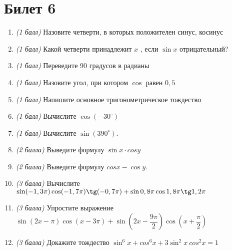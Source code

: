 \documentclass[12pt, a4paper]{article}
\begin{document}
\section*{Билет 6}
\begin{enumerate}
	\item \textit{(1 балл)}	Назовите четверти, в которых положителен синус, косинус 
	\item \textit{(1 балл)}	Какой четверти принадлежит $x$ , если $\sin x$ отрицательный?
	\item \textit{(1 балл)}	Переведите 90 градусов в радианы
	\item \textit{(1 балл)}	Назовите угол, при котором $\cos$  равен $0,5$
	\item \textit{(1 балл)} Напишите основное тригонометрическое тождество
	\item \textit{(1 балл)} Вычислите $\cos (-30^{\circ})$
	\item \textit{(1 балл)}	Вычислите $\sin (390^{\circ})$.
	\item \textit{(2 балла)} Выведите формулу $\sin x \cdot cos y$ 
	\item \textit{(2 балла)} Выведите формулу $cos x - \cos y$.
	\item \textit{(3 балла)} Вычислите $\sin(-1,3\pi) \cos (-1,7 \pi) \tg (-0,7 \pi)+ \sin 0,8 \pi \cos 1,8 \pi \tg 1,2 \pi$
	\item \textit{(3 балла)} Упростите выражение $\sin(2x-\pi) \cos (x-3\pi) + \sin (2x- \dfrac{9 \pi}{2}) \cos (x+\dfrac{\pi}{2})$
	\item \textit{(3 балла)} Докажите тождество $\sin^6x + cos^6x + 3\sin^2x \ cos^2x = 1$
\end{enumerate}

\newpage 
\end{document}
